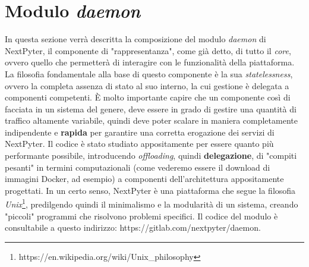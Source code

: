\section{Modulo \textit{daemon}}
In questa sezione verrà descritta la composizione del modulo \textit{daemon} di NextPyter, il componente di "rappresentanza", come già detto, di tutto il \textit{core}, ovvero quello che permetterà di interagire con le funzionalità della piattaforma.
\newline
La filosofia fondamentale alla base di questo componente è la sua \textit{statelessness}, ovvero la completa assenza di stato al suo interno, la cui gestione è delegata a componenti competenti. È molto importante capire che un componente così di facciata in un sistema del genere, deve essere in grado di gestire una quantità di traffico altamente variabile, quindi deve poter scalare in maniera completamente indipendente e \textbf{rapida} per garantire una corretta erogazione dei servizi di NextPyter.
\newline
Il codice è stato studiato appositamente per essere quanto più performante possibile, introducendo \textit{offloading}, quindi \textbf{delegazione}, di "compiti pesanti" in termini computazionali (come vederemo essere il download di immagini Docker, ad esempio) a componenti dell'architettura appositamente progettati.
\newline
In un certo senso, NextPyter è una piattaforma che segue la filosofia \textit{Unix}\footnote{https://en.wikipedia.org/wiki/Unix_philosophy}, predilgendo quindi il minimalismo e la modularità di un sistema, creando "piccoli" programmi che risolvono problemi specifici.
\newline
Il codice del modulo è consultabile a questo indirizzo: https://gitlab.com/nextpyter/daemon.
